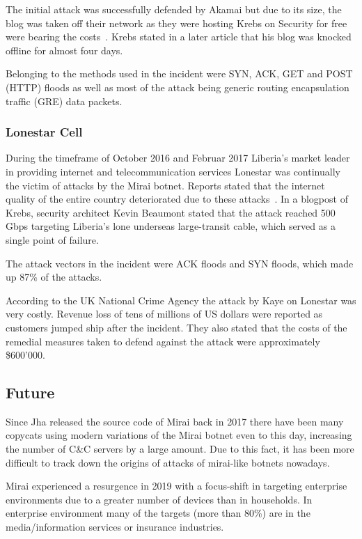The initial attack was successfully defended by Akamai but due to its size, the blog was taken off their network as they were hosting Krebs on Security for free were bearing the costs~\cite{Osborne16}.
Krebs stated in a later article that his blog was knocked offline for almost four days.\cite{Krebs19}

Belonging to the methods used in the incident were SYN, ACK, GET and POST (HTTP) floods as well as most of the attack being generic routing encapsulation traffic (GRE) data packets.\cite{Antonakakis17}

\subsubsection{Lonestar Cell}
During the timeframe of October 2016 and Februar 2017 Liberia's market leader in providing internet and telecommunication services Lonestar was continually the victim of attacks by the Mirai botnet.
Reports stated that the internet quality of the entire country deteriorated due to these attacks~\cite{Antonakakis17}.
In a blogpost of Krebs, security architect Kevin Beaumont stated that the attack reached 500 Gbps targeting Liberia's lone underseas large-transit cable, which served as a single point of failure.\cite{Krebs16}

The attack vectors in the incident were ACK floods and SYN floods, which made up 87\% of the attacks.\cite{Antonakakis17}

According to the UK National Crime Agency the attack by Kaye on Lonestar was very costly.
Revenue loss of tens of millions of US dollars were reported as customers jumped ship after the incident.
They also stated that the costs of the remedial measures taken to defend against the attack were approximately \$600'000.\cite{Cimpanu19}

\subsection{Future}
Since Jha released the source code of Mirai back in 2017 there have been many copycats using modern variations of the Mirai botnet even to this day, increasing the number of C\&C servers by a large amount.
Due to this fact, it has been more difficult to track down the origins of attacks of mirai-like botnets nowadays.

Mirai experienced a resurgence in 2019 with a focus-shift in targeting enterprise environments due to a greater number of devices than in households.
In enterprise environment many of the targets (more than 80\%) are in the media/information services or insurance industries.\cite{Lemos19}

